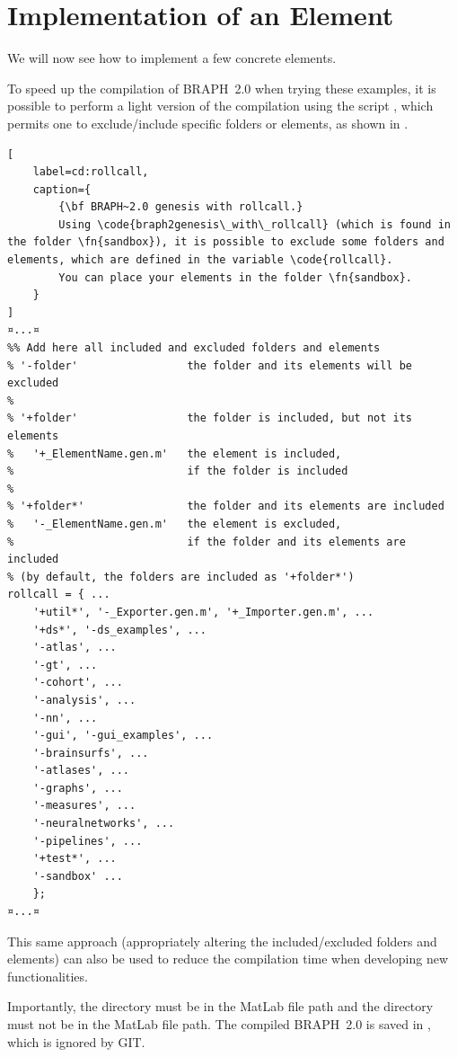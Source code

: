 \documentclass{tufte-handout}
\begin{document}
\section{Implementation of an Element}

We will now see how to implement a few concrete elements.

\begin{fullwidth}
\begin{tcolorbox}[
	title=Light compilation of BRAPH~2.0
]
To speed up the compilation of BRAPH~2.0 when trying these examples, it is possible to perform a light version of the compilation using the script , which permits one to exclude/include specific folders or elements, as shown in .
%
\begin{lstlisting}[
	label=cd:rollcall,
	caption={
		{\bf BRAPH~2.0 genesis with rollcall.}
		Using \code{braph2genesis\_with\_rollcall} (which is found in the folder \fn{sandbox}), it is possible to exclude some folders and elements, which are defined in the variable \code{rollcall}.
		You can place your elements in the folder \fn{sandbox}.
	}
]
¤...¤
%% Add here all included and excluded folders and elements
% '-folder'                 the folder and its elements will be excluded
%
% '+folder'                 the folder is included, but not its elements
%   '+_ElementName.gen.m'   the element is included,
%                           if the folder is included
%
% '+folder*'                the folder and its elements are included
%   '-_ElementName.gen.m'   the element is excluded,
%                           if the folder and its elements are included
% (by default, the folders are included as '+folder*')
rollcall = { ...
    '+util*', '-_Exporter.gen.m', '+_Importer.gen.m', ...
    '+ds*', '-ds_examples', ...
    '-atlas', ...
    '-gt', ...
    '-cohort', ...
    '-analysis', ...
    '-nn', ...
    '-gui', '-gui_examples', ...
    '-brainsurfs', ...
    '-atlases', ...
    '-graphs', ...
    '-measures', ...
    '-neuralnetworks', ...
    '-pipelines', ...
    '+test*', ...
    '-sandbox' ...
    };
¤...¤
\end{lstlisting}

This same approach (appropriately altering the included/excluded folders and elements) can also be used to reduce the compilation time when developing new functionalities.

Importantly, the directory  must be in the MatLab file path and the directory  must not be in the MatLab file path.
The compiled BRAPH~2.0 is saved in , which is ignored by GIT.
\end{tcolorbox}
\end{fullwidth}
\end{document}
